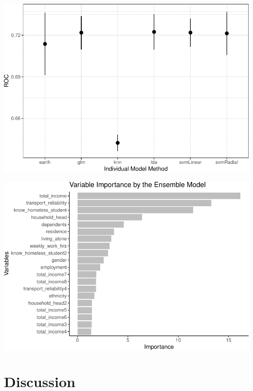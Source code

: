 \documentclass[
  10pt,
]{article}
\begin{document}
\begin{center}\includegraphics{phase2_report_files/figure-latex/unnamed-chunk-26-1} \end{center}

\begin{center}\includegraphics{phase2_report_files/figure-latex/unnamed-chunk-27-1} \end{center}

\hypertarget{discussion}{%
\section{Discussion}\label{discussion}}
\end{document}
